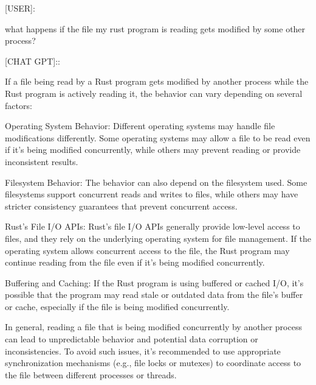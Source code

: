 [USER]:

what happens if the file my rust program is reading gets modified by some other process?

[CHAT GPT]::


If a file being read by a Rust program gets modified by another process while the Rust program is actively reading it, the behavior can vary depending on several factors:

    Operating System Behavior: Different operating systems may handle file modifications differently. Some operating systems may allow a file to be read even if it's being modified concurrently, while others may prevent reading or provide inconsistent results.

    Filesystem Behavior: The behavior can also depend on the filesystem used. Some filesystems support concurrent reads and writes to files, while others may have stricter consistency guarantees that prevent concurrent access.

    Rust's File I/O APIs: Rust's file I/O APIs generally provide low-level access to files, and they rely on the underlying operating system for file management. If the operating system allows concurrent access to the file, the Rust program may continue reading from the file even if it's being modified concurrently.

    Buffering and Caching: If the Rust program is using buffered or cached I/O, it's possible that the program may read stale or outdated data from the file's buffer or cache, especially if the file is being modified concurrently.

In general, reading a file that is being modified concurrently by another process can lead to unpredictable behavior and potential data corruption or inconsistencies. To avoid such issues, it's recommended to use appropriate synchronization mechanisms (e.g., file locks or mutexes) to coordinate access to the file between different processes or threads.


